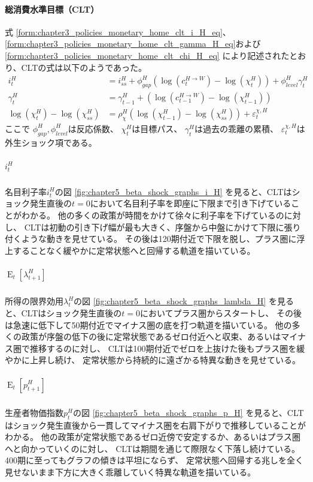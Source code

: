 \paragraph{総消費水準目標（CLT）}
\label{sec:chapter5_beta_shock_policies_clt}
式
\eqref{form:chapter3_policies_monetary_home_clt_i_H_eq}、
\eqref{form:chapter3_policies_monetary_home_clt_gamma_H_eq}および
\eqref{form:chapter3_policies_monetary_home_clt_chi_H_eq}
により記述されたとおり、CLTの式は以下のようであった。
\begin{align}
    \label{form:chapter5_beta_shock_policies_clt_i_H_eq}
        i_t^H&=i_{ss}^H+\phi_{gap}^H(\log(c_t^{H\to W})-\log(\chi_t^H))+\phi_{level}^H\gamma_t^H \\
    \label{form:chapter5_beta_shock_policies_clt_gamma_H_eq}
        \gamma_t^H&=\gamma_{t-1}^H+(\log(c_{t-1}^{H\to W})-\log(\chi_{t-1}^H)) \\
    \label{form:chapter5_beta_shock_policies_clt_chi_H_eq}
        \log(\chi_t^H)-\log(\chi_{ss}^H)&=\rho_{\chi}^H\left(\log(\chi_{t-1}^H)-\log(\chi_{ss}^H)\right)+\varepsilon_t^{\chi,H}
\end{align}
ここで
\(\phi_{gap}^H,\phi_{level}^H\)は反応係数、
\(\chi_t^H\)は目標パス、
\(\gamma_t^H\)は過去の乖離の累積、
\(\varepsilon_t^{\chi,H}\)は外生ショック項である。

\subparagraph{\(i_t^H\)}
\label{sec:chapter5_beta_shock_policies_clt_i_H}     
名目利子率\(i_t^H\)の図
\ref{fig:chapter5_beta_shock_graphs_i_H}
を見ると、CLTはショック発生直後の\(t=0\)において名目利子率を即座に下限まで引き下げていることがわかる。
他の多くの政策が時間をかけて徐々に利子率を下げているのに対し、
CLTは初動の引き下げ幅が最も大きく、序盤から中盤にかけて下限に張り付くような動きを見せている。
その後は120期付近で下限を脱し、プラス圏に浮上することなく緩やかに定常状態へと回帰する軌道を描いている。

\subparagraph{\(\operatorname{E}_t[\lambda_{t+1}^H]\)}
\label{sec:chapter5_beta_shock_policies_clt_E_lambda_H}
所得の限界効用\(\lambda_t^H\)の図
\ref{fig:chapter5_beta_shock_graphs_lambda_H}
を見ると、CLTはショック発生直後の\(t=0\)においてプラス圏からスタートし、
その後は急速に低下して50期付近でマイナス圏の底を打つ軌道を描いている。
他の多くの政策が序盤の低下の後に定常状態であるゼロ付近へと収束、あるいはマイナス圏で推移するのに対し、
CLTは100期付近でゼロを上抜けた後もプラス圏を緩やかに上昇し続け、
定常状態から持続的に遠ざかる特異な動きを見せている。

\subparagraph{\(\operatorname{E}_t[p_{t+1}^H]\)}
\label{sec:chapter5_beta_shock_policies_clt_E_p_H}
生産者物価指数\(p_t^H\)の図
\ref{fig:chapter5_beta_shock_graphs_p_H}
を見ると、CLTはショック発生直後から一貫してマイナス圏を右肩下がりで推移していることがわかる。
他の政策が定常状態であるゼロ近傍で安定するか、あるいはプラス圏へと向かっていくのに対し、
CLTは期間を通じて際限なく下落し続けている。
400期に至ってもグラフの傾きは平坦にならず、
定常状態へ回帰する兆しを全く見せないまま下方に大きく乖離していく特異な軌道を描いている。

